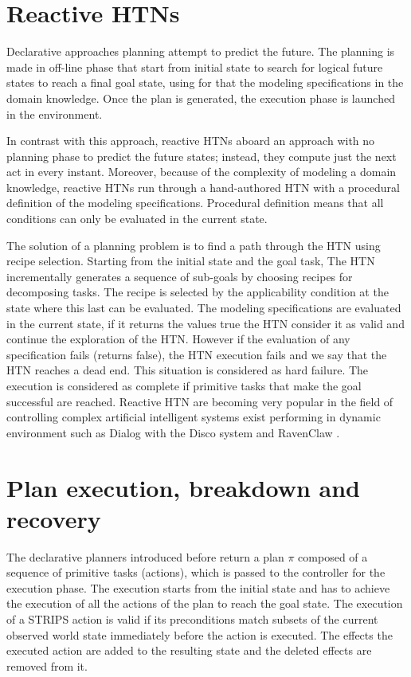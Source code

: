 \section{Reactive HTNs}
\par Declarative approaches planning attempt to predict the future.  The planning is made in off-line phase that start from initial state to search for logical future states to reach a final goal state, using for that the modeling specifications in the domain knowledge. Once the plan is generated, the execution phase is launched in the environment. 
\par In contrast with this approach, reactive HTNs aboard an approach with no planning phase to predict the future states; instead, they compute just the next act in every instant. Moreover, because of the complexity of modeling a domain knowledge, reactive HTNs run through a hand-authored HTN with a procedural definition of the modeling specifications. Procedural definition means that all conditions can only be evaluated in the current state. 
\par The solution of a planning problem is to find a path through the HTN using recipe selection. Starting from the initial state and the goal task, The HTN incrementally generates a sequence of sub-goals by choosing recipes for decomposing tasks. The recipe is selected by the applicability condition at the state where this last can be evaluated. The modeling specifications are evaluated in the current state, if it returns the values true the HTN consider it as valid and continue the exploration of the HTN. However if the evaluation of any specification fails (returns false), the HTN execution fails and we say that the HTN reaches a dead end. This situation is considered as hard failure. The execution is considered as complete if primitive tasks that make the goal successful are reached. 
Reactive HTN are becoming very popular in the field of controlling complex artificial intelligent systems exist performing in dynamic environment such as Dialog with the Disco  system \cite{rich2009building} and RavenClaw \cite{bohus2003ravenclaw}.



\section{Plan execution, breakdown and recovery}
The declarative planners introduced before return a plan $\pi$ composed of a sequence of primitive tasks (actions), which is passed to the controller for the execution phase. 
The execution starts from the initial state and has to achieve the execution of all the actions of the plan to reach the goal state.  
The execution of a STRIPS action is valid if its preconditions match subsets of the current observed world state immediately before the action is executed. The effects the executed action are added to the resulting state and the deleted effects are removed from it.  


